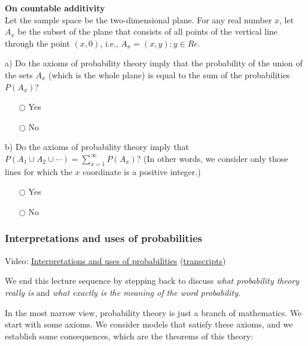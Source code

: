 \documentclass[pdftex, brazil, 12pt, twoside]{article}
\begin{document}
\begin{exercise}
  \textbf{On countable additivity}\\
  Let the sample space be the two-dimensional plane. For any real number $x$,
  let $A_x$ be the subset of the plane that consists of all points of the vertical
  line through the point $(x, 0)$, i.e., $A_x = {(x, y) : y \in Re}$.

  a) Do the axioms of probability theory imply that the probability of the union
  of the sets $A_x$ (which is the whole plane) is equal to the sum of the
  probabilities $P(A_x)$?
  \begin{itemize}[noitemsep]
  \item[$\bigcirc$] Yes
  \item[$\bigcirc$] No
  \end{itemize}

  b) Do the axioms of probability theory imply that
  $\displaystyle P(A_1 \cup A_2 \cup \cdots) = \sum_{x=1}^{\infty} P(A_x)$? (In
  other words, we consider only those lines for which the $x$ coordinate is
  a positive integer.)
  \begin{itemize}[noitemsep]
  \item[$\bigcirc$] Yes
  \item[$\bigcirc$] No
  \end{itemize}
\end{exercise}

\subsubsection{Interpretations and uses of probabilities}
\label{un1-lec1-interpretation-and-use}

Video: \href{https://www.youtube.com/watch?v=XsUNKLd7N5Y}{Interpretations and uses of probabilities}
(\href{Unit-1/01\_lecture\_1\_probability\_models\_and\_axioms/l01\_9\_transcripts.pdf}{transcripts})

We end this lecture sequence by stepping back to discuss
\emph{what probability theory really is} and \emph{what exactly is the
  meaning of the word probability}.

In the most narrow view, probability theory is just a
branch of mathematics.
We start with some axioms.
We consider models that satisfy these axioms, and we
establish some consequences, which are the
theorems of this theory:

\begin{figure}[H]
  \begin{center}
  \end{center}
\end{figure}
\end{document}

